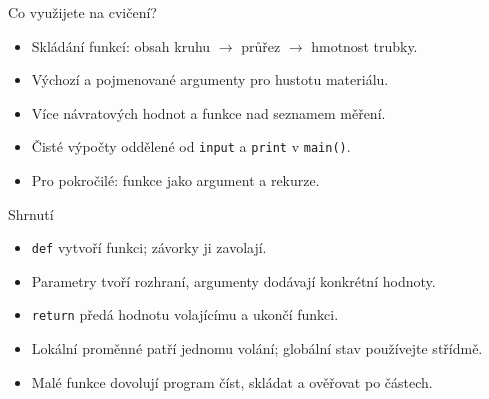 \documentclass[aspectratio=169]{beamer}
\begin{document}
\begin{frame}{Co využijete na cvičení?}
  \begin{itemize}
    \item Skládání funkcí: obsah kruhu $\rightarrow$ průřez $\rightarrow$ hmotnost trubky.
    \item Výchozí a pojmenované argumenty pro hustotu materiálu.
    \item Více návratových hodnot a funkce nad seznamem měření.
    \item Čisté výpočty oddělené od \texttt{input} a \texttt{print} v \texttt{main()}.
    \item Pro pokročilé: funkce jako argument a rekurze.
  \end{itemize}
\end{frame}

\begin{frame}{Shrnutí}
  \begin{itemize}
    \item \texttt{def} vytvoří funkci; závorky ji zavolají.
    \item Parametry tvoří rozhraní, argumenty dodávají konkrétní hodnoty.
    \item \texttt{return} předá hodnotu volajícímu a ukončí funkci.
    \item Lokální proměnné patří jednomu volání; globální stav používejte střídmě.
    \item Malé funkce dovolují program číst, skládat a ověřovat po částech.
  \end{itemize}
\end{frame}
\end{document}
